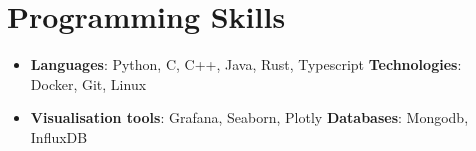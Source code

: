 \documentclass[a4paper,11pt]{article}
\newcommand{\resumeSubHeadingListStart}{\begin{itemize}[leftmargin=*]}
\newcommand{\resumeSubHeadingListEnd}{\end{itemize}}
\begin{document}
\section{Programming Skills}
 \resumeSubHeadingListStart
   \item{
     \textbf{Languages}{: Python, C, C++, Java, Rust, Typescript}
     \hfill
     \textbf{Technologies}{: Docker, Git, Linux}
   }

   \item{
    \textbf{Visualisation tools}{: Grafana, Seaborn, Plotly}
    \hfill
    \textbf{Databases}{: Mongodb, InfluxDB}
  }
 \resumeSubHeadingListEnd


\end{document}
